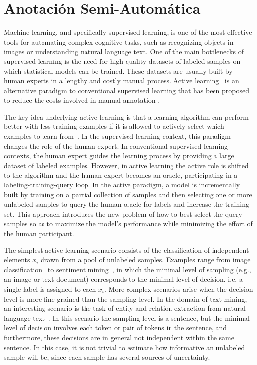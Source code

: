   \section{Anotación Semi-Automática}

Machine learning, and specifically supervised learning, is one of the most effective tools for automating complex cognitive tasks, such as recognizing objects in images or understanding natural language text.
One of the main bottlenecks of supervised learning is the need for high-quality datasets of labeled samples on which statistical models can be trained.
These datasets are usually built by human experts in a lengthy and costly manual process.
Active learning~\cite{Cohn2010ActiveL} is an alternative paradigm to conventional supervised learning that has been proposed to reduce the costs involved in manual annotation .

The key idea underlying active learning is that a learning algorithm can perform better with less training examples if it is allowed to actively select which examples to learn from~\cite{survey}.
In the supervised learning context, this paradigm changes the role of the human expert.
In conventional supervised learning contexts, the human expert guides the learning process by providing a large dataset of labeled examples. However, in active learning the active role is shifted to the algorithm and the human expert becomes an oracle, participating in a labeling-training-query loop.
In the active paradigm,  a model is incrementally built by training on a partial collection of samples and then selecting one or more unlabeled samples to query the human oracle for labels and increase the training set.
This approach introduces the new problem of how to best select the query samples so as to maximize the model's performance while minimizing the effort of the human participant.

The simplest active learning scenario consists of  the classification of independent elements $x_i$ drawn from a pool of unlabeled samples.
Examples range from image classification~\cite{Gal2017DeepBA} to sentiment mining~\cite{Kranjc2015ActiveLF},  in which the minimal level of sampling (e.g., an image or text document) corresponds to the minimal level of decision. i.e, a single label is assigned to each $x_i$. More complex scenarios arise when the decision level is more fine-grained than the sampling level. In the domain of text mining, an interesting scenario is the task of entity and relation extraction from natural language text~\cite{zhang2012unified}.
In this scenario the sampling level is a sentence, but the minimal level of decision involves each token or pair of tokens in the sentence, and furthermore, these decisions are in general not independent within the same sentence.
In this case, it is not trivial to estimate how informative an unlabeled sample will be, since each sample has several sources of uncertainty.

